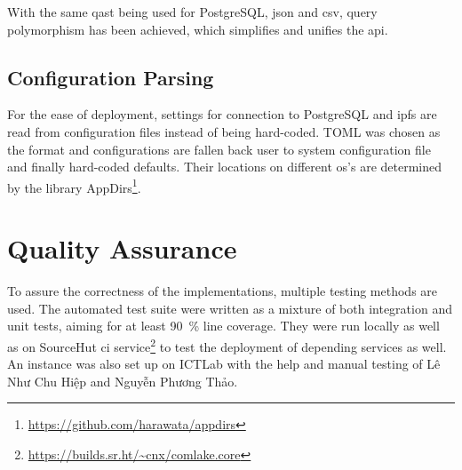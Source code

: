 With the same \gls{qast} being used for PostgreSQL, \gls{json} and \gls{csv},
query polymorphism has been achieved, which simplifies and unifies
the \gls{api}.

\subsection{Configuration Parsing}
For the ease of deployment, settings for connection to PostgreSQL
and \gls{ipfs} are read from configuration files instead of being hard-coded.
TOML was chosen as the format and configurations are fallen back
user to system configuration file and finally hard-coded defaults.
Their locations on different \gls{os}'s are determined by the library
AppDirs\footnote{\url{https://github.com/harawata/appdirs}}.

\section{Quality Assurance}
To assure the correctness of the implementations, multiple testing methods
are used.  The automated test suite were written as a mixture of
both integration and unit tests, aiming for at least \SI{90}{\percent}
line coverage.  They were run locally as well as on SourceHut \gls{ci}
service\footnote{\url{https://builds.sr.ht/~cnx/comlake.core}}
to test the deployment of depending services as well.  An instance
was also set up on ICTLab with the help and manual testing
of {Lê Như Chu Hiệp and Nguyễn Phương Thảo}.

